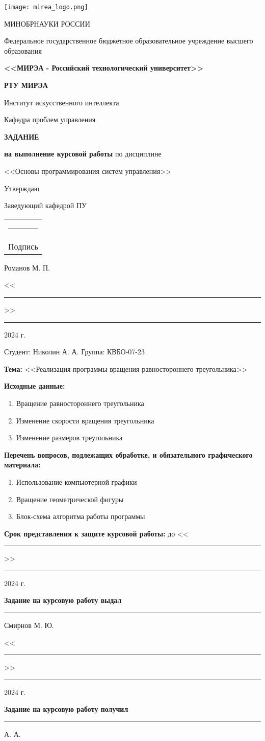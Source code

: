 \documentclass[14pt]{extarticle}
\makeatletter
\newcommand{\termtitle}{{\centering
	\texttt{[image: mirea\_logo.png]}\par\vspace{1cm}
    \vspace{-0.7cm}
	{МИНОБРНАУКИ РОССИИ\par}
	\vspace{0.3cm}
	{Федеральное государственное бюджетное образовательное учреждение высшего образования\par}
	\vspace{0.1cm}
	{\textbf{<<МИРЭА - Российский технологический университет>>}\par}
 \vspace{0.1cm}
 {\textbf{РТУ МИРЭА}\par}
 \vspace{0.1cm}
 {Институт искусственного интеллекта\par}
 {Кафедра проблем управления\par}}}
\newcommand{\rubybot}[2]{%
  \begin{tabular}[t]{@{}c@{}}
    #2\\[-6.7pt]
    \fontsize{1}{1}
    \setlength{\normalbaselineskip}{0pt}\footnotesize#1
  \end{tabular}%
}
\makeatother
\begin{document}
{ %
    \termtitle
    \vspace{0.5cm}
    {   
        \centering
        {\textbf{ЗАДАНИЕ}\par}
        \vspace{0.1cm}
        {\textbf{на выполнение курсовой работы} по дисциплине\par}
        {<<Основы программирования систем управления>>}\par
    }
    \vspace{0.3cm}
    {
        \raggedleft
        Утверждаю\par
        \vspace{0.3cm}
        Заведующий кафедрой ПУ\par
        \rubybot{Подпись}{\rule{3.5cm}{0.5pt}} Романов М. П.\par
        <<\rule{0.75cm}{.5pt}>>
         \rule{2.5cm}{.5pt}
         2024 г.
    }
    \par
    \vspace{0.3cm}
    \raggedright
    Студент: Николин А. А. Группа: КВБО-07-23\par
    \textbf{Тема:} <<Реализация программы вращения равностороннего треугольника>>\par
    \textbf{Исходные данные:}\par
    \begin{enumerate}[itemsep=2pt, parsep=0pt, topsep=3pt]
        \item{Вращение равностороннего треугольника}
        \item{Изменение скорости вращения треугольника}
        \item{Изменение размеров треугольника}
    \end{enumerate}\par
    \textbf{Перечень вопросов, подлежащих обработке, и обязательного графического материала:}\par
    \begin{enumerate}[itemsep=2pt, parsep=0pt, topsep=1pt]
        \item{Использование компьютерной графики}
        \item{Вращение геометрической фигуры}
        \item{Блок-схема алгоритма работы программы}
    \end{enumerate}\par
    \textbf{Срок представления к защите курсовой работы: }
    до <<\rule{0.6cm}{.5pt}>>
         \rule{1cm}{.5pt}
         2024 г.\par
    \vspace{0.3cm}
    \textbf{Задание на курсовую работу выдал} \hfill \rule{3.75cm}{.5pt}\hfill{Смирнов М. Ю.}\par
    \raggedleft
    <<\rule{0.75cm}{.5pt}>>
         \rule{2.5cm}{.5pt}
         2024 г.\par
    \raggedright
    \vspace{0.3cm}
    \textbf{Задание на курсовую работу получил} \hfill \rule{3.5cm}{.5pt} А. А.\par
    \vfill
    \newpage
}
\end{document}
